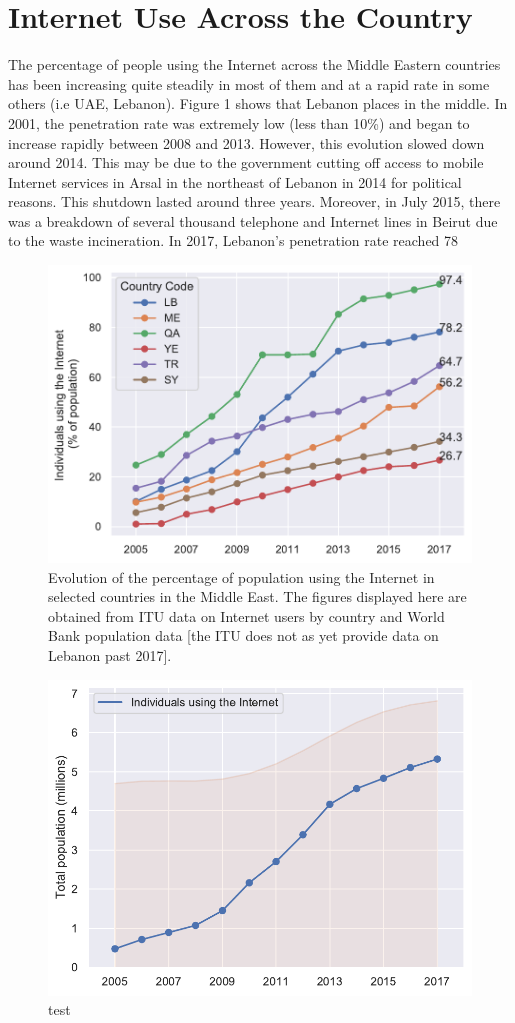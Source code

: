 \documentclass[a4paper,titlepage]{article}
\begin{document}
\section{Internet Use Across the Country}
The percentage of people using the Internet across the Middle Eastern countries has been increasing quite steadily in most of them and at a rapid rate in some others (i.e UAE, Lebanon). Figure 1 shows that Lebanon places in the middle.
In 2001, the penetration rate was extremely low (less than 10\%) and began to increase rapidly between 2008 and 2013. However, this evolution slowed down around 2014. This may be due to the government cutting off access to mobile Internet services in Arsal in the northeast of Lebanon in 2014 for political reasons. This shutdown lasted around three years. Moreover, in July 2015, there was a breakdown of several thousand telephone and Internet lines in Beirut due to the waste incineration.
In 2017, Lebanon’s penetration rate reached 78%

\begin{figure}
    \centering
    \includegraphics[width=0.75\linewidth]{../output/internet-users.pdf}
    \caption{Evolution of the percentage of population using the Internet in selected countries in the Middle East. The figures displayed here are obtained from ITU data on Internet users by country and World Bank population data [the ITU does not as yet provide data on Lebanon past 2017].}
\end{figure}

\begin{figure}
    \centering
    \includegraphics[width=0.75\linewidth]{../output/population-internet-lbn.pdf}
    \caption{test}
\end{figure}
\end{document}
